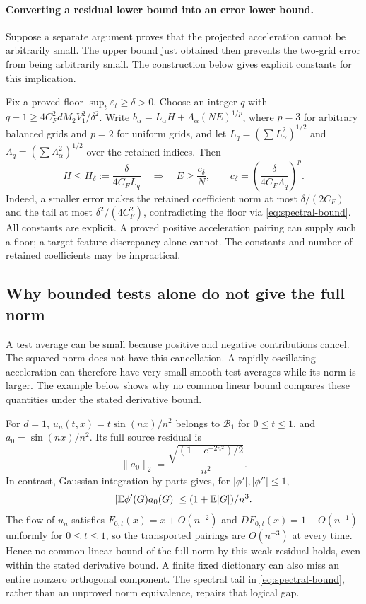 \paragraph{Converting a residual lower bound into an error lower bound.}
Suppose a separate argument proves that the projected acceleration cannot
be arbitrarily small. The upper bound just obtained then prevents the
two-grid error from being arbitrarily small. The construction below gives
explicit constants for this implication.

Fix a proved floor $\sup_t\varepsilon_t\ge\delta>0$. Choose an integer $q$
with $q+1\ge4C_F^2dM_2V_1^2/\delta^2$. Write
$b_\alpha=L_\alpha H+\Lambda_\alpha(NE)^{1/p}$, where $p=3$ for arbitrary
balanced grids and $p=2$ for uniform grids, and let
$L_q=(\sum L_\alpha^2)^{1/2}$ and
$\Lambda_q=(\sum\Lambda_\alpha^2)^{1/2}$ over the retained indices. Then
\[
 H\le H_\delta:=\frac{\delta}{4C_FL_q}
 \quad\Longrightarrow\quad
 E\ge\frac{c_\delta}{N},\qquad
 c_\delta=\left(\frac{\delta}{4C_F\Lambda_q}\right)^p.
\]
Indeed, a smaller error makes the retained coefficient norm at most
$\delta/(2C_F)$ and the tail at most $\delta^2/(4C_F^2)$, contradicting the
floor via \eqref{eq:spectral-bound}. All constants are explicit. A proved positive acceleration pairing
can supply such a floor; a target-feature discrepancy alone cannot.
The constants and number of retained coefficients may be impractical.

\subsection{Why bounded tests alone do not give the full norm}
A test average can be small because positive and negative contributions
cancel. The squared norm does not have this cancellation. A rapidly
oscillating acceleration can therefore have very small smooth-test
averages while its norm is larger. The example below shows why no common
linear bound compares these quantities under the stated derivative bound.

For $d=1$, $u_n(t,x)=t\sin(nx)/n^2$ belongs to $\mathcal B_1$ for
$0\le t\le1$, and $a_0=\sin(nx)/n^2$. Its full source residual is
\[
 \|a_0\|_2=\frac{\sqrt{(1-e^{-2n^2})/2}}{n^2}.
\]
In contrast, Gaussian integration by parts gives, for
$|\phi'|,|\phi''|\le1$,
\[
 |\mathbb E\phi'(G)a_0(G)|\le (1+\mathbb E|G|)/n^3.
\]
The flow of $u_n$ satisfies $F_{0,t}(x)=x+O(n^{-2})$ and
$DF_{0,t}(x)=1+O(n^{-1})$ uniformly for $0\le t\le1$, so the transported
pairings are $O(n^{-3})$ at every time.
Hence no common linear bound of the full norm by this weak residual holds,
even within the stated derivative bound. A finite fixed dictionary can
also miss an entire nonzero orthogonal component. The spectral tail in
\eqref{eq:spectral-bound}, rather than an unproved norm equivalence, repairs
that logical gap.

